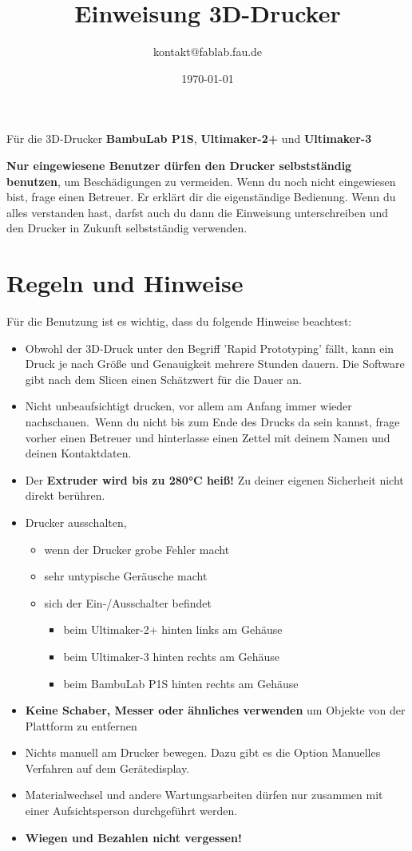 \documentclass{\basedir/fablab-document}
\date{\today}
\author{kontakt@fablab.fau.de}
\title{Einweisung 3D-Drucker}
\begin{document}
\maketitle
\begin{center}
	Für die 3D-Drucker \textbf{BambuLab P1S}, \textbf{Ultimaker-2+} und \textbf{Ultimaker-3}
\end{center}

\textbf{Nur eingewiesene Benutzer dürfen den Drucker selbstständig benutzen}, um  Beschädigungen zu vermeiden. Wenn du noch nicht eingewiesen bist, frage einen Betreuer. Er erklärt dir die eigenständige Bedienung. Wenn du alles verstanden hast, darfst auch du dann die Einweisung unterschreiben und den Drucker in Zukunft selbstständig verwenden.

\section{Regeln und Hinweise}
Für die Benutzung ist es wichtig, dass du folgende Hinweise beachtest:

\begin{itemize}
 \item Obwohl der 3D-Druck unter den Begriff 'Rapid Prototyping' fällt, kann ein Druck je nach Größe und Genauigkeit mehrere Stunden dauern. Die Software gibt nach dem Slicen einen Schätzwert für die Dauer an.
 \item Nicht unbeaufsichtigt drucken, vor allem am Anfang immer wieder nachschauen.\
Wenn du nicht bis zum Ende des Drucks da sein kannst, frage vorher einen Betreuer und hinterlasse einen Zettel mit deinem Namen und deinen Kontaktdaten.
   \item Der \textbf{Extruder wird bis zu 280°C heiß!} Zu deiner eigenen Sicherheit nicht direkt berühren.
 \item Drucker ausschalten,
 \begin{itemize}
  \item wenn der Drucker grobe Fehler macht 
  \item sehr untypische Geräusche macht
  \item sich der Ein-/Ausschalter befindet
  \begin{itemize}
   \item beim Ultimaker-2+ hinten links am Gehäuse
   \item beim Ultimaker-3 hinten rechts am Gehäuse
   \item beim BambuLab P1S hinten rechts am Gehäuse
  \end{itemize}
 \end{itemize}
 \item \textbf{Keine Schaber, Messer oder ähnliches verwenden} um Objekte von der Plattform zu entfernen
 \item Nichts manuell am Drucker bewegen. Dazu gibt es die Option Manuelles Verfahren auf dem Gerätedisplay.
 \item Materialwechsel und andere Wartungsarbeiten dürfen nur zusammen mit einer Aufsichtsperson durchgeführt werden.
 \item \textbf{Wiegen und Bezahlen nicht vergessen!}
\end{itemize}
\end{document}
